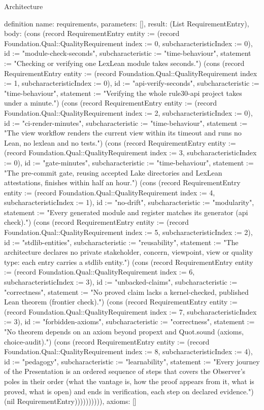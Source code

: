 \begin{lexlean}{Architecture}
\begin{semanticmodule}
definition{
  name: requirements,
  parameters: [],
  result: (List RequirementEntry),
  body: (cons (record RequirementEntry {entity := (record Foundation.Qual::QualityRequirement {index := 0, subcharacteristicIndex := 0}), id := "module-check-seconds", subcharacteristic := "time-behaviour", statement := "Checking or verifying one LexLean module takes seconds."}) (cons (record RequirementEntry {entity := (record Foundation.Qual::QualityRequirement {index := 1, subcharacteristicIndex := 0}), id := "api-verify-seconds", subcharacteristic := "time-behaviour", statement := "Verifying the whole rule30-api project takes under a minute."}) (cons (record RequirementEntry {entity := (record Foundation.Qual::QualityRequirement {index := 2, subcharacteristicIndex := 0}), id := "ci-render-minutes", subcharacteristic := "time-behaviour", statement := "The view workflow renders the current view within its timeout and runs no Lean, no lexlean and no tests."}) (cons (record RequirementEntry {entity := (record Foundation.Qual::QualityRequirement {index := 3, subcharacteristicIndex := 0}), id := "gate-minutes", subcharacteristic := "time-behaviour", statement := "The pre-commit gate, reusing accepted Lake directories and LexLean attestations, finishes within half an hour."}) (cons (record RequirementEntry {entity := (record Foundation.Qual::QualityRequirement {index := 4, subcharacteristicIndex := 1}), id := "no-drift", subcharacteristic := "modularity", statement := "Every generated module and register matches its generator (api check)."}) (cons (record RequirementEntry {entity := (record Foundation.Qual::QualityRequirement {index := 5, subcharacteristicIndex := 2}), id := "stdlib-entities", subcharacteristic := "reusability", statement := "The architecture declares no private stakeholder, concern, viewpoint, view or quality type: each entry carries a stdlib entity."}) (cons (record RequirementEntry {entity := (record Foundation.Qual::QualityRequirement {index := 6, subcharacteristicIndex := 3}), id := "unbacked-claims", subcharacteristic := "correctness", statement := "No proved claim lacks a kernel-checked, published Lean theorem (frontier check)."}) (cons (record RequirementEntry {entity := (record Foundation.Qual::QualityRequirement {index := 7, subcharacteristicIndex := 3}), id := "forbidden-axioms", subcharacteristic := "correctness", statement := "No theorem depends on an axiom beyond propext and Quot.sound (axioms, choice-audit)."}) (cons (record RequirementEntry {entity := (record Foundation.Qual::QualityRequirement {index := 8, subcharacteristicIndex := 4}), id := "pedagogy", subcharacteristic := "learnability", statement := "Every journey of the Presentation is an ordered sequence of steps that covers the Observer's poles in their order (what the vantage is, how the proof appears from it, what is proved, what is open) and ends in verification, each step on declared evidence."}) (nil RequirementEntry)))))))))),
  axioms: []
}


\end{semanticmodule}
\end{lexlean}
